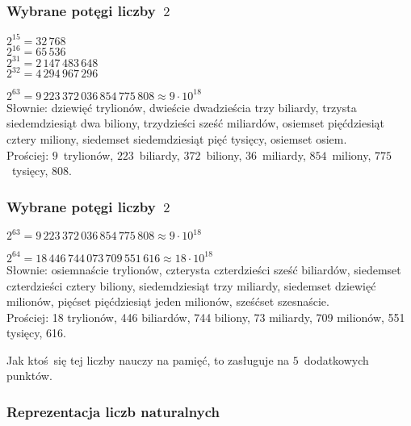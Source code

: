 \documentclass[10pt,t]{beamer}
\begin{document}
\begin{frame}
  \frametitle{Wybrane potęgi liczby~$2$}


  $2^{ 15 } = 32 \, 768$ \\[0.1em]
  $2^{ 16 } = 65 \, 536$ \\[0.1em]
  $2^{ 31 } = 2 \, 147 \, 483 \, 648$ \\[0.1em]
  $2^{ 32 } = 4 \, 294 \, 967 \, 296$

  \VerSpaceThree





  $2^{ 63 } = 9 \, 223 \, 372 \, 036 \, 854 \, 775 \, 808 \approx
  9 \cdot 10^{ 18 }$ \\
  Słownie: dziewięć trylionów, dwieście dwadzieścia trzy biliardy, trzysta
  siedemdziesiąt dwa biliony, trzydzieści sześć miliardów, osiemset
  pięćdziesiąt cztery miliony, siedemset siedemdziesiąt pięć tysięcy,
  osiemset osiem. \\
  Prościej: $9$~trylionów, $223$~biliardy, $372$~biliony,
  $36$~miliardy, $854$~miliony, $775$~tysięcy, $808$.

\end{frame}





\begin{frame}
  \frametitle{Wybrane potęgi liczby~$2$}


  $2^{ 63 } = 9 \, 223 \, 372 \, 036 \, 854 \, 775 \, 808 \approx
  9 \cdot 10^{ 18 }$

  $2^{ 64 } = 18 \, 446 \, 744 \, 073 \, 709 \, 551 \, 616 \approx
  18 \cdot 10^{ 18 }$ \\
  Słownie: osiemnaście trylionów, czterysta czterdzieści sześć biliardów,
  siedemset czterdzieści cztery biliony, siedemdziesiąt trzy miliardy,
  siedemset dziewięć milionów, pięćset pięćdziesiąt jeden milionów,
  sześćset szesnaście. \\
  Prościej: 18 trylionów, 446 biliardów, 744 biliony, 73 miliardy,
  709 milionów, 551 tysięcy, 616.

  Jak ktoś~się tej liczby nauczy na pamięć, to zasługuje na $5$~dodatkowych
  punktów.

\end{frame}





\begin{frame}
  \frametitle{Reprezentacja liczb naturalnych}




\end{frame}
\end{document}
